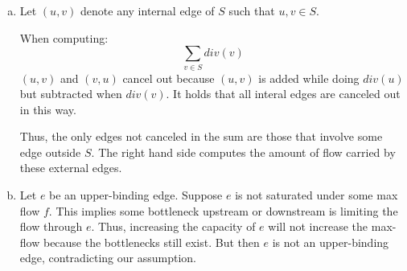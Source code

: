 \documentclass[10pt]{article}
\begin{document}
\begin{solution}
\begin{enumerate} [(a)]
{        

        The max-flow here is $5$, so both edges are saturated. 
        However, no upper-binding edge exists. 
    }
    \item {
        Let $(u, v)$ denote any internal edge of $S$ such that $u, v \in S$. 
        
        When computing:
        $$
        \sum_{v \in S} div(v)
        $$
        $(u, v)$ and $(v, u)$ cancel out because $(u, v)$ is added while doing
        $div(u)$ but subtracted when $div(v)$. 
        It holds that all interal edges are canceled out in this way. 
        
        Thus, the only edges not canceled in the sum are those that involve some 
        edge outside $S$. 
        The right hand side computes the amount of flow carried by these 
        external edges. 
    }
    \item {
        Let $e$ be an upper-binding edge. 
        Suppose $e$ is not saturated under some max flow $f$. 
        This implies some bottleneck upstream or downstream is limiting the flow 
        through $e$. 
        Thus, increasing the capacity of $e$ will not increase the max-flow 
        because the bottlenecks still exist. 
        But then $e$ is not an upper-binding edge, contradicting our assumption. 
    }

\end{enumerate}

\end{solution}

\newpage


\end{document}
